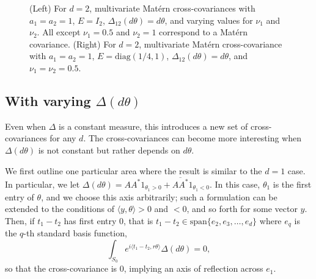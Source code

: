 \documentclass[11pt]{article}
\begin{document}
\begin{figure}
\caption{
(Left) For $d=2$, multivariate Mat\'ern cross-covariances with $a_1 = a_2 = 1$, $E = I_2$, $\Delta_{12}(d\theta) = d\theta$, and varying values for $\nu_1$ and $\nu_2$. All except $\nu_1 = 0.5$ and $\nu_2 = 1$ correspond to a Mat\'ern covariance. (Right) For $d=2$, multivariate Mat\'ern cross-covariance with $a_1 = a_2 = 1$, $E = \textrm{diag}(1/4, 1)$, $\Delta_{12}(d\theta) = d\theta$, and $\nu_1 = \nu_2 = 0.5$.}
\label{fig:spatial1}
\end{figure}


\subsection{With varying $\Delta(d\theta)$}

Even when $\Delta$ is a constant measure, this introduces a new set of cross-covariances for any $d$. The cross-covariances can become more interesting when $\Delta(d\theta)$ is not constant but rather depends on $d\theta$. 

We first outline one particular area where the result is similar to the $d=1$ case. In particular, we let $\Delta(d\theta) = AA^* 1_{\theta_1 > 0} + \overline{AA^*}1_{\theta_1 < 0}$. In this case, $\theta_1$ is the first entry of $\theta$, and we choose this axis arbitrarily; such a formulation can be extended to the conditions of $\langle y, \theta\rangle >0$ and $<0$, and so forth for some vector $y$. Then, if $t_1 - t_2$ has first entry $0$, that is $t_1 - t_2 \in \textrm{span}\{e_2,e_3,\dots, e_d\}$ where $e_q$ is the $q$-th standard basis function, $$\int_{S_0} e^{i\langle t_1 - t_2, r\theta\rangle}\Delta(d\theta)=0,$$so that the cross-covariance is $0$, implying an axis of reflection across $e_1$. 
\end{document}
